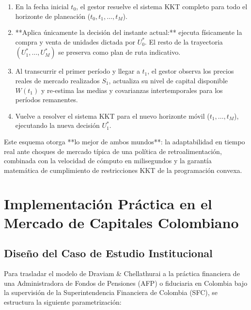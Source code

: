 \documentclass[11pt,a4paper]{report}
\numberwithin{equation}{chapter}
\begin{document}
\begin{conceptbox}
\begin{enumerate}
    \item En la fecha inicial $t_0$, el gestor resuelve el sistema KKT completo para todo el horizonte de planeación ($t_0, t_1, \dots, t_M$).
    \item **Aplica únicamente la decisión del instante actual:** ejecuta físicamente la compra y venta de unidades dictada por $U_0^*$. El resto de la trayectoria $(U_1^*, \dots, U_M^*)$ se preserva como plan de ruta indicativo.
    \item Al transcurrir el primer período y llegar a $t_1$, el gestor observa los precios reales de mercado realizados $S_1$, actualiza su nivel de capital disponible $W(t_1)$ y re-estima las medias y covarianzas intertemporales para los períodos remanentes.
    \item Vuelve a resolver el sistema KKT para el nuevo horizonte móvil ($t_1, \dots, t_M$), ejecutando la nueva decisión $U_1^*$.
\end{enumerate}
Este esquema otorga **lo mejor de ambos mundos**: la adaptabilidad en tiempo real ante choques de mercado típica de una política de retroalimentación, combinada con la velocidad de cómputo en milisegundos y la garantía matemática de cumplimiento de restricciones KKT de la programación convexa.
\end{conceptbox}

\chapter{Implementación Práctica en el Mercado de Capitales Colombiano}

\section{Diseño del Caso de Estudio Institucional}

Para trasladar el modelo de Draviam \& Chellathurai a la práctica financiera de una Administradora de Fondos de Pensiones (AFP) o fiduciaria en Colombia bajo la supervisión de la Superintendencia Financiera de Colombia (SFC), se estructura la siguiente parametrización:
\end{document}
